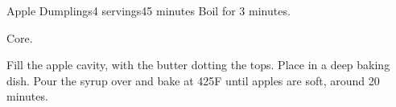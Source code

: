 \documentclass[../Cookbook.tex]{subfiles}
\begin{document}
\begin{recipe}[AppleDumplings]{Apple Dumplings}{4 servings}{45 minutes}
Boil for 3 minutes.

Core.

Fill the apple cavity, with the butter dotting the tops. Place in a deep baking dish.
Pour the syrup over and bake at 425\0F until apples are soft, around 20 minutes. %
\end{recipe}
\end{document}
